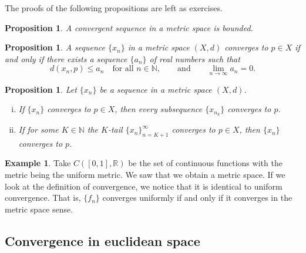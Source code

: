 \documentclass[12pt,openany]{book}
\newcommand{\R}{{\mathbb{R}}}
\newcommand{\N}{{\mathbb{N}}}
\theoremstyle{plain}
\newtheorem{prop}[thm]{Proposition}
\theoremstyle{remark}
\newtheorem{remark}[thm]{Remark}
\theoremstyle{definition}
\theoremstyle{exercise}
\theoremstyle{example}
\newtheorem{example}[thm]{Example}
\begin{document}
The proofs of the following propositions are left as exercises.

\begin{prop} \label{prop:msconvbound}
A convergent sequence in a metric space is bounded.
\end{prop}

\begin{prop} \label{prop:msconvifa}
A sequence $\{ x_n \}$ in a metric space $(X,d)$ converges to $p \in X$
if and only
if there exists a sequence $\{ a_n \}$ of real numbers such that
\begin{equation*}
d(x_n,p) \leq a_n \quad \text{for all } n \in \N,
\qquad \text{and} \qquad
\lim_{n\to\infty} a_n = 0.
\end{equation*}
\end{prop}

\begin{prop} \label{prop:mssubseq}
Let $\{ x_n \}$ be a sequence in a metric space $(X,d)$.
\begin{enumerate}[(i)]
\item If $\{ x_n \}$ converges to $p \in X$, then every subsequence $\{ x_{n_k} \}$
converges to $p$.
\item If for some $K \in \N$ the $K$-tail $\{ x_n \}_{n=K+1}^\infty$
converges to $p \in X$, then
 $\{ x_n \}$ converges to $p$.
\end{enumerate}
\end{prop}

\begin{example}
Take $C([0,1],\R)$ be the set of continuous functions with the metric being
the uniform metric.  We saw that we obtain a metric space.
If we look at the definition of convergence, we notice that it is identical
to uniform convergence.  That is, $\{ f_n \}$ converges uniformly if and only
if it converges in the metric space sense.
\end{example}


\subsection{Convergence in euclidean space}
\end{document}
